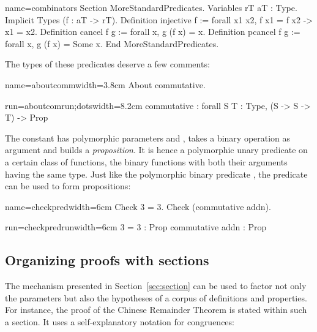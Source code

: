 \begin{coq}{name=combinators}{}
Section MoreStandardPredicates.
Variables rT aT : Type.
Implicit Types (f : aT -> rT).
Definition injective f := forall x1 x2, f x1 = f x2 -> x1 = x2.
Definition cancel f g := forall x, g (f x) = x.
Definition pcancel f g := forall x, g (f x) = Some x.
End MoreStandardPredicates.
\end{coq}
The types of these predicates deserve a few comments:

\begin{coq-left}{name=aboutcomm}{width=3.8cm}
About commutative.
$~$
\end{coq-left}
\begin{coqout-right}{run=aboutcomrun;dots}{width=8.2cm}
commutative :
  forall S T : Type, (S -> S -> T) -> Prop
\end{coqout-right}

The constant  has polymorphic parameters  and ,
takes a binary operation as argument and builds a
\emph{proposition}. It is hence a polymorphic unary predicate on
a certain class of functions, the binary functions with both their
arguments having the same type. Just like the
polymorphic binary predicate , the predicate  can
be used to form propositions:

\begin{coq-left}{name=checkpred}{width=6cm}
Check 3 = 3.
Check (commutative addn).
\end{coq-left}
\begin{coqout-right}{run=checkpredrun}{width=6cm}
3 = 3 : Prop
commutative addn : Prop
\end{coqout-right}


\subsection{Organizing proofs with sections}

The  mechanism presented in Section~\ref{sec:section} can
be used to factor not only the parameters but also the hypotheses of a
corpus of definitions and properties. For instance, the proof of the
Chinese Remainder Theorem is stated within such a section. It uses a
self-explanatory notation for congruences:

